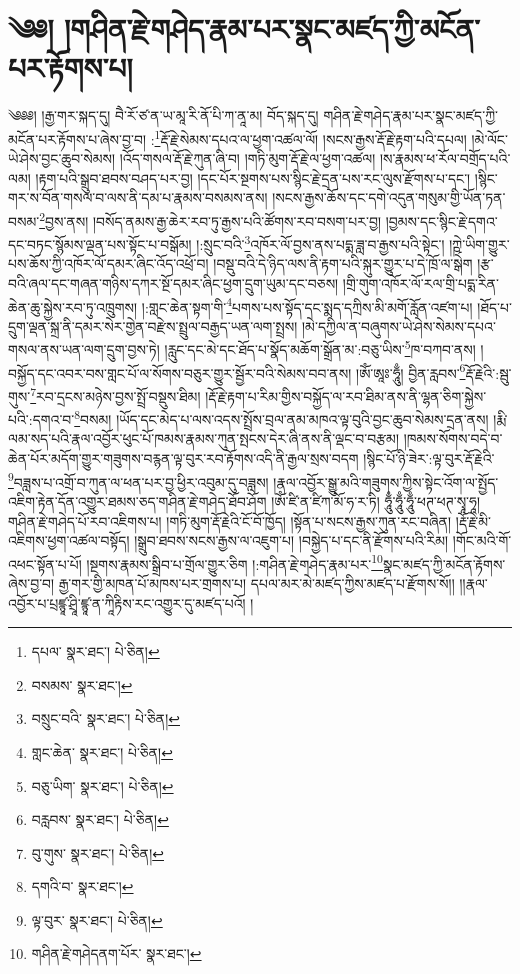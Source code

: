\setcounter{footnote}{0} 
\chapter{༄༅། །གཤིན་རྗེ་གཤེད་རྣམ་པར་སྣང་མཛད་ཀྱི་མངོན་པར་རྟོགས་པ།}༄༅༅། །རྒྱ་གར་སྐད་དུ། བཻ་རོ་ཙ་ན་ཡ་མཱ་རི་ནོ་པི་ཀ་ནཱ་མ། བོད་སྐད་དུ། གཤིན་རྗེ་གཤེད་རྣམ་པར་སྣང་མཛད་ཀྱི་མངོན་པར་རྟོགས་པ་ཞེས་བྱ་བ། :\footnote{དཔལ་  སྣར་ཐང་།  པེ་ཅིན། }རྡོ་རྗེ་སེམས་དཔའ་ལ་ཕྱག་འཚལ་ལོ། །སངས་རྒྱས་རྡོ་རྗེ་རྟག་པའི་དཔལ། །མེ་ལོང་ཡེ་ཤེས་བྱང་ཆུབ་སེམས། །འོད་གསལ་རྡོ་རྗེ་ཀུན་ཞི་བ། །གཏི་མུག་རྡོ་རྗེ་ལ་ཕྱག་འཚལ། །ས་རྣམས་ཕ་རོལ་བགྲོད་པའི་ལམ། །རྟག་པའི་སྒྲུབ་ཐབས་བཤད་པར་བྱ། །དང་པོར་སྔགས་པས་སྙིང་རྗེ་དྲན་པས་རང་ལུས་རྫོགས་པ་དང་། །སྙིང་གར་ས་བོན་གསལ་བ་ལས་ནི་དམ་པ་རྣམས་བསམས་ནས། །སངས་རྒྱས་ཆོས་དང་དགེ་འདུན་གསུམ་གྱི་ཡོན་ཏན་བསམ་\footnote{བསམས་  སྣར་ཐང་། }བྱས་ནས། །བསོད་ནམས་རྒྱ་ཆེར་རབ་ཏུ་རྒྱས་པའི་ཚོགས་རབ་བསག་པར་བྱ། །བྱམས་དང་སྙིང་རྗེ་དགའ་དང་བཏང་སྙོམས་ལྡན་པས་སྟོང་པ་བསྒོམ། །:སྲུང་བའི་\footnote{བསྲུང་བའི་  སྣར་ཐང་།  པེ་ཅིན། }འཁོར་ལོ་བྱས་ནས་པདྨ་ཟླ་བ་རྒྱས་པའི་སྟེང་། །ཀྵེ་ཡིག་གྱུར་པས་ཆོས་ཀྱི་འཁོར་ལོ་དམར་ཞིང་འོད་འཕྲོ་བ། །བསྡུ་བའི་དེ་ཉིད་ལས་ནི་རྟག་པའི་སྐུར་གྱུར་པ་དེ་ཁྲོ་ལ་སྒེག །རྩ་བའི་ཞལ་དང་གཞན་གཉིས་དཀར་སྔོ་དམར་ཞིང་ཕྱག་དྲུག་ཡུམ་དང་བཅས། །གྲི་གུག་འཁོར་ལོ་རལ་གྲི་པདྨ་རིན་ཆེན་ཆུ་སྐྱེས་རབ་ཏུ་འཁྲུགས། །:གླང་ཆེན་སྟག་གི་\footnote{གླང་ཆེན་  སྣར་ཐང་།  པེ་ཅིན། }པགས་པས་སྟོད་དང་སྨད་དཀྲིས་མི་མགོ་རློན་འཛག་པ། །ཐོད་པ་དྲུག་ལྡན་སྐྲ་ནི་དམར་སེར་གྱེན་བརྫེས་སྤྲུལ་བརྒྱད་ཡན་ལག་སྤྲས། །མེ་དཀྱིལ་ན་བཞུགས་ཡེ་ཤེས་སེམས་དཔའ་གསལ་ནས་ཡན་ལག་དྲུག་བྱས་ཏེ། །རླུང་དང་མེ་དང་ཐོད་པ་སྣོད་མཆོག་སྒྲོན་མ་:བཅུ་ཡིས་\footnote{བཅུ་ཡིག་  སྣར་ཐང་།  པེ་ཅིན། }ཁ་བཀབ་ནས། །བསྐྱོད་དང་འབར་བས་གླང་པོ་ལ་སོགས་བཅུར་གྱུར་སྦྱོར་བའི་སེམས་བབ་ནས། །ཨོཾ་ཨཱཿ་ཧཱུྃ། བྱིན་རླབས་\footnote{བརླབས་  སྣར་ཐང་།  པེ་ཅིན། }རྡོ་རྗེའི་:སྦུ་གུས་\footnote{བུ་གུས་  སྣར་ཐང་།  པེ་ཅིན། }རབ་དྲངས་མཉེས་བྱས་སྤྲོ་བསྡུས་ཐིམ། །རྡོ་རྗེ་རྟག་པ་རིམ་གྱིས་བསྐྱོད་ལ་རབ་ཐིམ་ནས་ནི་ལྷན་ཅིག་སྐྱེས་པའི་:དགའ་བ་\footnote{དགའི་བ་  སྣར་ཐང་། }བསམ། །ཡོད་དང་མེད་པ་ལས་འདས་སྤྲོས་བྲལ་ནམ་མཁའ་ལྟ་བུའི་བྱང་ཆུབ་སེམས་དྲན་ནས། །རྨི་ལམ་སད་པའི་རྣལ་འབྱོར་ཕུང་པོ་ཁམས་རྣམས་ཀུན་སྤངས་དེར་ཞི་ནས་ནི་ལྡང་བ་བརྩམ། །ཁམས་སོགས་བདེ་བ་ཆེན་པོར་མདོག་གྱུར་གཟུགས་བརྙན་ལྟ་བུར་རབ་རྟོགས་འདི་ནི་རྒྱལ་སྲས་བདག །སྙིང་པོ་ཉི་ཟེར་:ལྟ་བུར་རྡོ་རྗེའི་\footnote{ལྟ་བུར་  སྣར་ཐང་།  པེ་ཅིན། }བཟླས་པ་འགྲོ་བ་ཀུན་ལ་ཕན་པར་བྱ་ཕྱིར་འབུམ་དུ་བཟླས། །རྣལ་འབྱོར་སྒྱུ་མའི་གཟུགས་ཀྱིས་སྟེང་འོག་ལ་སྤྱོད་འཇིག་རྟེན་དོན་འགྱུར་ཐམས་ཅད་གཤིན་རྗེ་གཤེད་ཐོབ་ཤོག །ཨོཾ་ཛི་ན་ཛིཀ་མོ་ཧ་ར་ཏི། ཧཱུྃ་ཧཱུྃ་ཧཱུྃ་ཕཊ་ཕཊ་སྭཱ་ཧཱ། གཤིན་རྗེ་གཤེད་པོ་རབ་འཇིགས་པ། །གཏི་མུག་རྡོ་རྗེའི་ངོ་བོ་ཁྱོད། །སྟོན་པ་སངས་རྒྱས་ཀུན་རང་བཞིན། །རྡོ་རྗེ་མི་འཇིགས་ཕྱག་འཚལ་བསྟོད། །སྒྲུབ་ཐབས་སངས་རྒྱས་ལ་འཇུག་པ། །བསྐྱེད་པ་དང་ནི་རྫོགས་པའི་རིམ། །གོང་མའི་གོ་འཕང་སྟོན་པ་པོ། །སྔགས་རྣམས་སྒྲིབ་པ་གྲོལ་གྱུར་ཅིག །:གཤིན་རྗེ་གཤེད་རྣམ་པར་\footnote{གཤིན་རྗེ་གཤེདནག་པོར་  སྣར་ཐང་། }སྣང་མཛད་ཀྱི་མངོན་རྟོགས་ཞེས་བྱ་བ། རྒྱ་གར་གྱི་མཁན་པོ་མཁས་པར་གྲགས་པ། དཔལ་མར་མེ་མཛད་ཀྱིས་མཛད་པ་རྫོགས་སོ།། །།རྣལ་འབྱོར་པ་པྲཛྙཱ་ཤྲཱི་ཛྙཱ་ན་ཀཱིརྟིས་རང་འགྱུར་དུ་མཛད་པའོ། ། 